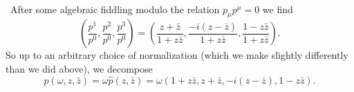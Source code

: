 \documentclass[11pt,letterpaper]{article}
\newcommand{\LP}{\left(}
\newcommand{\RP}{\right)}
\begin{document}
\\
\
After some algebraic fiddling modulo the relation $p_\mu p^\mu = 0$ we find \begin{equation}
\LP \frac{p^1}{p^0}, \frac{p^2}{p^0}, \frac{p^3}{p^0} \RP = \LP \frac{z + \bar{z}}{1 + z \bar{z}}, \frac{-i(z - \bar{z})}{1 + z \bar{z}}, \frac{1 - z \bar{z}}{1 + z \bar{z}} \RP.
\end{equation}
So up to an arbitrary choice of normalization (which we make slightly differently than we did above), we decompose \begin{equation}
p(\omega, z, \bar{z}) = \omega \hat{p}(z, \bar{z}) = \omega \LP 1 + z \bar{z}, z + \bar{z}, -i(z - \bar{z}), 1 - z \bar{z} \RP.
\end{equation}
\end{document}

